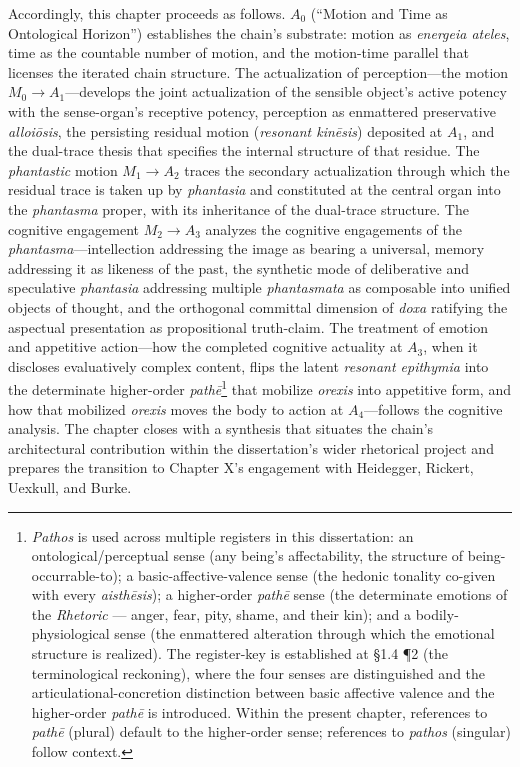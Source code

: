 \documentclass{article}
\begin{document}
Accordingly, this chapter proceeds as follows. $A_0$ (``Motion and Time as Ontological Horizon'') establishes the chain's substrate: motion as \textit{energeia ateles}, time as the countable number of motion, and the motion-time parallel that licenses the iterated chain structure. The actualization of perception---the motion $M_0 \rightarrow A_1$---develops the joint actualization of the sensible object's active potency with the sense-organ's receptive potency, perception as enmattered preservative \textit{alloiōsis}, the persisting residual motion (\textit{resonant kinēsis}) deposited at $A_1$, and the dual-trace thesis that specifies the internal structure of that residue. The \textit{phantastic} motion $M_1 \rightarrow A_2$ traces the secondary actualization through which the residual trace is taken up by \textit{phantasia} and constituted at the central organ into the \textit{phantasma} proper, with its inheritance of the dual-trace structure. The cognitive engagement $M_2 \rightarrow A_3$ analyzes the cognitive engagements of the \textit{phantasma}---intellection addressing the image as bearing a universal, memory addressing it as likeness of the past, the synthetic mode of deliberative and speculative \textit{phantasia} addressing multiple \textit{phantasmata} as composable into unified objects of thought, and the orthogonal committal dimension of \textit{doxa} ratifying the aspectual presentation as propositional truth-claim. The treatment of emotion and appetitive action---how the completed cognitive actuality at $A_3$, when it discloses evaluatively complex content, flips the latent \textit{resonant epithymia} into the determinate higher-order \textit{pathē}\footnote{\textit{Pathos} is used across multiple registers in this dissertation: an ontological/perceptual sense (any being's affectability, the structure of being-occurrable-to); a basic-affective-valence sense (the hedonic tonality co-given with every \textit{aisth\=esis}); a higher-order \textit{path\=e} sense (the determinate emotions of the \textit{Rhetoric} --- anger, fear, pity, shame, and their kin); and a bodily-physiological sense (the enmattered alteration through which the emotional structure is realized). The register-key is established at \S1.4 \P2 (the terminological reckoning), where the four senses are distinguished and the articulational-concretion distinction between basic affective valence and the higher-order \textit{path\=e} is introduced. Within the present chapter, references to \textit{path\=e} (plural) default to the higher-order sense; references to \textit{pathos} (singular) follow context.} that mobilize \textit{orexis} into appetitive form, and how that mobilized \textit{orexis} moves the body to action at $A_4$---follows the cognitive analysis. The chapter closes with a synthesis that situates the chain's architectural contribution within the dissertation's wider rhetorical project and prepares the transition to Chapter X's engagement with Heidegger, Rickert, Uexkull, and Burke.
\end{document}
